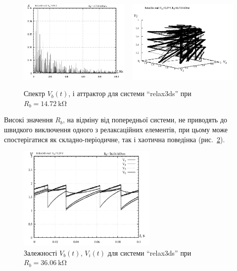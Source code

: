 \begin{figure}[htb!]
  \centerline{
    \includegraphics[width=0.48\textwidth]{p/relax3ds_f_014718.png}
    ~
    \includegraphics[width=0.48\textwidth]{p/relax3ds_v1v2v3_014718.png}
  }
  \caption{Спектр $V_b(t)$, і аттрактор для системи ``relax3ds'' при $R_b=\SI{14.72}{\kilo \ohm} $}
  \label{atu:f:relax3ds_f_14718}
\end{figure}

Високі значення
$ R_b $, на відміну від попередньої системи, не приводять до швидкого
виключення одного з релаксаційних елементів, при цьому може
спостерігатися як складно-періодичне, так і хаотична поведінка
(рис.~\ref{atu:f:relax3ds_t_36060}).

\begin{figure}[htb!]
  \centerline{\includegraphics[width=0.6\textwidth]{p/relax3ds_t_036060.png} }
  \caption{Залежності $V_b(t)$, $V_i(t)$ для системи ``relax3ds'' при $R_b = \SI{36.06}{\kilo\ohm} $}
  \label{atu:f:relax3ds_t_36060}
\end{figure}

